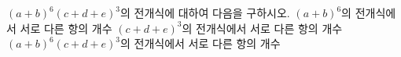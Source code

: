 $(a+b)^6(c+d+e)^3$의 전개식에 대하여 다음을 구하시오.
 $(a+b)^6$의 전개식에서 서로 다른 항의 개수
 $(c+d+e)^3$의 전개식에서 서로 다른 항의 개수
 $(a+b)^6(c+d+e)^3$의 전개식에서 서로 다른 항의 개수
